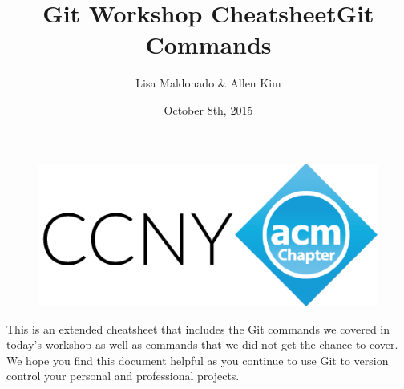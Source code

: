 \documentclass{article} %
\begin{document}
\setlength{\textfloatsep}{.01pt}

\begin{figure}[t]
\includegraphics[scale=0.5]{ccnylogo0}
\centering
\end{figure}

\author{Lisa Maldonado \& Allen Kim}
\title{Git Workshop Cheatsheet}
\date{October 8th, 2015}
\maketitle

\begin{center}
This is an extended cheatsheet that includes the Git commands we covered in today's workshop as well as commands that we did not get the chance to cover. We hope you find this document helpful as you continue to use Git to version control your personal and professional projects.
\end{center}

\title{\large Git Commands}
\centering
\end{document}

